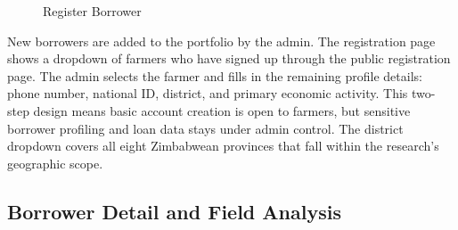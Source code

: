 \documentclass[12pt,a4paper]{article}
\begin{document}
\begin{figure}[H]
\caption{Register Borrower}
\label{fig:register_borrower}
\end{figure}

New borrowers are added to the portfolio by the admin. The registration page shows a dropdown of farmers who have signed up through the public registration page. The admin selects the farmer and fills in the remaining profile details: phone number, national ID, district, and primary economic activity. This two-step design means basic account creation is open to farmers, but sensitive borrower profiling and loan data stays under admin control. The district dropdown covers all eight Zimbabwean provinces that fall within the research's geographic scope.

\subsection{Borrower Detail and Field Analysis}
\end{document}
